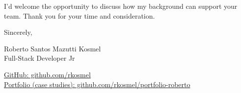 \documentclass{article}
\begin{document}
\vspace{4mm}

I'd welcome the opportunity to discuss how my background can support your team. Thank you for your time and consideration.

\vspace{6mm}

Sincerely,

\vspace{4mm}

Roberto Santos Mazutti Kosmel \\
Full-Stack Developer Jr \\

\vspace{4mm}

\href{https://github.com/rkosmel}{GitHub: github.com/rkosmel} \\
\href{https://github.com/rkosmel/portfolio-roberto}{Portfolio (case studies): github.com/rkosmel/portfolio-roberto}
\end{document}
